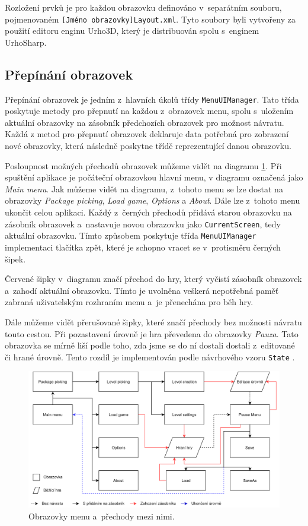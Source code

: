 Rozložení prvků je pro každou obrazovku definováno v~separátním souboru, pojmenovaném \texttt{[Jméno obrazovky]Layout.xml}. Tyto soubory byli vytvořeny za použití editoru enginu Urho3D, který je distribuován spolu s~enginem UrhoSharp. 

\subsection{Přepínání obrazovek}
Přepínání obrazovek je jedním z~hlavních úkolů třídy \texttt{MenuUIManager}. Tato třída poskytuje metody pro přepnutí na každou z~obrazovek menu, spolu s~uložením aktuální obrazovky na zásobník předchozích obrazovek pro možnost návratu. Každá z  metod pro přepnutí obrazovek deklaruje data potřebná pro zobrazení nové obrazovky, která následně poskytne třídě reprezentující danou obrazovku.

Posloupnost možných přechodů obrazovek můžeme vidět na diagramu \ref{fig:screen_structure}. Při spuštění aplikace je počáteční obrazovkou hlavní menu, v diagramu označená jako \textit{Main menu}. Jak můžeme vidět na diagramu, z~tohoto menu se lze dostat na obrazovky \textit{Package picking}, \textit{Load game}, \textit{Options} a \textit{About}. Dále lze z~tohoto menu ukončit celou aplikaci. Každý z~černých přechodů přidává starou obrazovku na zásobník obrazovek a~nastavuje novou obrazovku jako \texttt{CurrentScreen}, tedy aktuální obrazovku. Tímto způsobem poskytuje třída \texttt{MenuUIManager} implementaci tlačítka zpět, které je schopno vracet se v~protisměru černých šipek.

Červené šipky v~diagramu značí přechod do hry, který vyčistí zásobník obrazovek a~zahodí aktuální obrazovku. Tímto je uvolněna veškerá nepotřebná paměť zabraná uživatelským rozhraním menu a~je přenechána pro běh hry.

Dále můžeme vidět přerušované šipky, které značí přechody bez možnosti návratu touto cestou. Při pozastavení úrovně je hra převedena do obrazovky \textit{Pauza}. Tato obrazovka se mírně liší podle toho, zda jsme se do ní dostali dostali z~editované či hrané úrovně. Tento rozdíl je implementován podle návrhového vzoru \texttt{State} \citep[str.~305]{book:gangoffour}.

\begin{figure}[h]
	\centering
	\includegraphics[width=\textwidth]{img/ScreenStructure.png}
	\caption{Obrazovky menu a~přechody mezi nimi.}
	\label{fig:screen_structure}
\end{figure}


